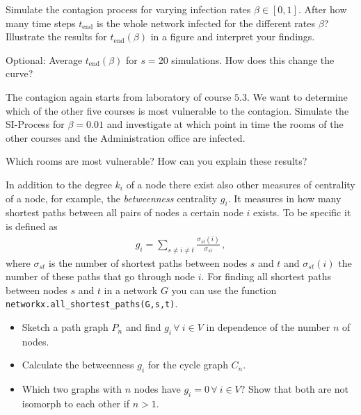 Simulate the contagion process for varying infection rates $\beta \in [0,1]$. After how many time steps $t_{\mathrm{end}}$ is the whole network infected for the different rates $\beta$? Illustrate the results for $t_{\mathrm{end}}(\beta)$ in a figure and interpret your findings.

Optional:  Average $t_{\mathrm{end}}(\beta)$ for $s=20$ simulations. How does this change the curve?

\subexercise[%
  topic= Vulnerable Courses,
    ]

The contagion again starts from laboratory of course $5.3$. We want to
determine which of the other five courses is most vulnerable to the
contagion. Simulate the SI-Process for $\beta=0.01$ and investigate at
which point in time the rooms of the other courses and the
Administration office are infected. 

Which rooms are most vulnerable? How can you explain these results?


\exercise[%
  topic =  \emph{Betweenness} Centrality
      ]


In addition to the degree $k_i$ of a node there exist also other
measures of centrality of a node, for example, the \emph{betweenness}
centrality $g_i$. It measures in how many shortest paths between all
pairs of nodes a certain node $i$ exists. To be specific it is defined as 
\begin{align}
g_i = \sum_{s\neq i\neq t} \frac{\sigma_{st}(i)}{\sigma_{st}}\,,
\end{align}
where $\sigma_{st}$ is the number of shortest paths between nodes $s$
and $t$ and  $\sigma_{st}(i)$ the number of these paths that go through
node $i$. For finding all shortest paths between nodes $s$ and $t$ in a
network $G$ you can use the function
\texttt{networkx.all\_shortest\_paths(G,s,t)}.

\subexercise[%
  topic= Betweenness Centrality of Graph Models,
    ]

\begin{itemize}
\item Sketch a path graph $P_n$ and find $g_i\,\forall\ i \in V$ in dependence of the number $n$ of nodes.
\item Calculate the betweenness $g_i$ for the cycle graph $C_n$.
\item Which two graphs with $n$ nodes have $g_i=0\,\forall\ i \in V$? Show that both are not isomorph to each other if $n>1$.
\end{itemize}


\subexercise[%
  topic= Betweenness Centrality of a Complete Graph after Deletion of an Edge,
    ]

